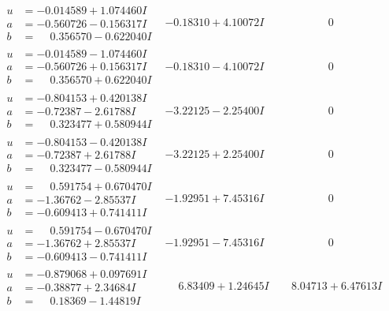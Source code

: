\documentclass[1p]{elsarticle_modified}
\theoremstyle{definition}
\begin{document}
$$\begin{array}{c|c|c}
\begin{aligned}
u &= -0.014589 + 1.074460 I \\
a &= -0.560726 - 0.156317 I \\
b &= \phantom{-}0.356570 - 0.622040 I\end{aligned}
 & -0.18310 + 4.10072 I & \phantom{-0.000000 } 0 \\ \hline\begin{aligned}
u &= -0.014589 - 1.074460 I \\
a &= -0.560726 + 0.156317 I \\
b &= \phantom{-}0.356570 + 0.622040 I\end{aligned}
 & -0.18310 - 4.10072 I & \phantom{-0.000000 } 0 \\ \hline\begin{aligned}
u &= -0.804153 + 0.420138 I \\
a &= -0.72387 - 2.61788 I \\
b &= \phantom{-}0.323477 + 0.580944 I\end{aligned}
 & -3.22125 - 2.25400 I & \phantom{-0.000000 } 0 \\ \hline\begin{aligned}
u &= -0.804153 - 0.420138 I \\
a &= -0.72387 + 2.61788 I \\
b &= \phantom{-}0.323477 - 0.580944 I\end{aligned}
 & -3.22125 + 2.25400 I & \phantom{-0.000000 } 0 \\ \hline\begin{aligned}
u &= \phantom{-}0.591754 + 0.670470 I \\
a &= -1.36762 - 2.85537 I \\
b &= -0.609413 + 0.741411 I\end{aligned}
 & -1.92951 + 7.45316 I & \phantom{-0.000000 } 0 \\ \hline\begin{aligned}
u &= \phantom{-}0.591754 - 0.670470 I \\
a &= -1.36762 + 2.85537 I \\
b &= -0.609413 - 0.741411 I\end{aligned}
 & -1.92951 - 7.45316 I & \phantom{-0.000000 } 0 \\ \hline\begin{aligned}
u &= -0.879068 + 0.097691 I \\
a &= -0.38877 + 2.34684 I \\
b &= \phantom{-}0.18369 - 1.44819 I\end{aligned}
 & \phantom{-}6.83409 + 1.24645 I & \phantom{-}8.04713 + 6.47613 I \\ \hline\begin{aligned}

\end{aligned}
\end{array}$$
\end{document}
